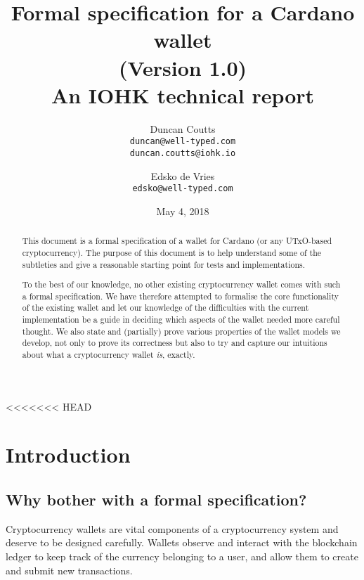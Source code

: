 \documentclass{article}
\theoremstyle{definition}{
  \newtheorem{lemma}{Lemma}[section] %
  \newtheorem{definition}[lemma]{Definition}
}
\theoremstyle{theorem}{
  \newtheorem{invariant}[lemma]{Invariant}
  \newtheorem{proofobligation}[lemma]{Proof Obligation}
}
\numberwithin{equation}{lemma}
\begin{document}
<<<<<<< HEAD
\title{Formal specification for a Cardano wallet \\
       {\small (Version 1.0)} \\
       {\large \sc An IOHK technical report}}
\author{Duncan Coutts \\ {\small \texttt{duncan@well-typed.com}} \\
                         {\small \texttt{duncan.coutts@iohk.io}}
   \and Edsko de Vries \\ {\small \texttt{edsko@well-typed.com}}}
\date{May 4, 2018}

\maketitle

\begin{abstract}
This document is a formal specification of a wallet for Cardano (or any
UTxO-based cryptocurrency). The purpose of this document is to help understand
some of the subtleties and give a reasonable starting point for tests and
implementations.

To the best of our knowledge, no other existing cryptocurrency wallet comes with
such a formal specification. We have therefore attempted to formalise the core
functionality of the existing wallet and let our knowledge of the difficulties
with the current implementation be a guide in deciding which aspects of the
wallet needed more careful thought. We also state and (partially) prove various
properties of the wallet models we develop, not only to prove its correctness
but also to try and capture our intuitions about what a cryptocurrency wallet
\emph{is}, exactly.
\end{abstract}

\section{Introduction}

\subsection{Why bother with a formal specification?}

Cryptocurrency wallets are vital components of a cryptocurrency system and
deserve to be designed carefully. Wallets observe and interact with the
blockchain ledger to keep track of the currency belonging to a user, and allow
them to create and submit new transactions.
\end{document}
